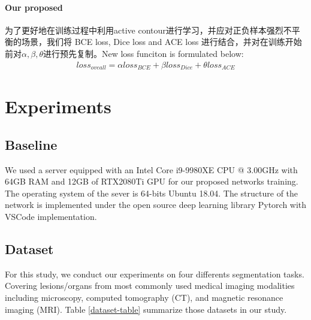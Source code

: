 \documentclass{ieeeaccess}
\begin{document}
  \paragraph{Our proposed}
  为了更好地在训练过程中利用active contour进行学习，并应对正负样本强烈不平衡的场景，我们将 BCE loss, Dice loss and ACE loss 进行结合，并对在训练开始前对\(\alpha, \beta, \theta\)进行预先复制。New loss funciton is formulated below:
  \begin{align}
    loss_{oveall} = \alpha loss_{BCE} + \beta loss_{Dice} + \theta loss_{ACE}
  \end{align}
  
  
  
  
  
  \section{Experiments}
  \subsection{Baseline}
  We used a server equipped with an Intel Core i9-9980XE CPU @ 3.00GHz with 64GB RAM and 12GB of RTX2080Ti GPU for
  our proposed networks training. The operating system of the sever is 64-bits Ubuntu 18.04. The structure of the network 
  is implemented under the open source deep learning library Pytorch with VSCode implementation.
  
  \subsection{Dataset}
  For this study, we conduct our experiments on four differents segmentation tasks. 
  Covering lesions/organs from most commonly used medical imaging modalities including microscopy, 
  computed tomography (CT), and magnetic resonance imaging (MRI).  Table \ref{dataset-table} summarize those datasets in our study.
  
\end{document}
